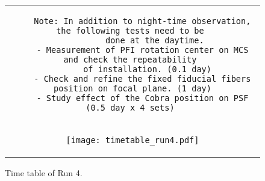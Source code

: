 \begin{figure}[!ht]
\begin{center}
\begin{tabular}{c}
\begin{minipage}{0.95\hsize}
\begin{verbatim}
    Note: In addition to night-time observation, the following tests need to be 
          done at the daytime. 
    - Measurement of PFI rotation center on MCS and check the repeatability 
      of installation. (0.1 day)
    - Check and refine the fixed fiducial fibers position on focal plane. (1 day)
    - Study effect of the Cobra position on PSF (0.5 day x 4 sets) 
\end{verbatim}
\end{minipage} \\
\begin{minipage}{0.8\hsize}
	\begin{center}
	\vspace*{5mm}
	\texttt{[image: timetable\_run4.pdf]}
	\end{center}
	\vspace*{-5mm}
	\caption{Time table of Run 4.}
	\label{fig:run4}
\end{minipage}
\end{tabular}
\end{center}
\end{figure}

